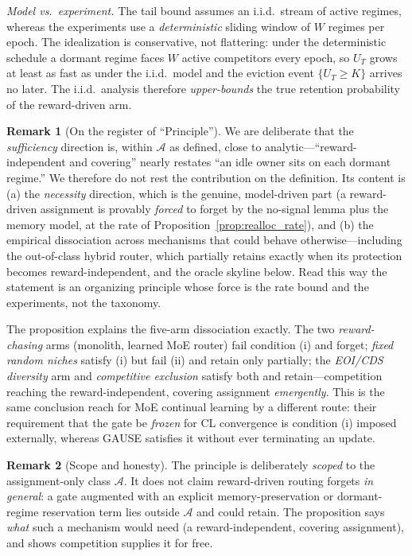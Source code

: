 \documentclass[11pt,a4paper]{article}
\theoremstyle{definition}
\newtheorem{remark}{Remark}[section]
\theoremstyle{plain}
\begin{document}
\noindent\emph{Model vs.\ experiment.} The tail bound assumes an i.i.d.\ stream of
active regimes, whereas the experiments use a \emph{deterministic} sliding window of
$W$ regimes per epoch. The idealization is conservative, not flattering: under the
deterministic schedule a dormant regime faces $W$ active competitors every epoch, so
$U_T$ grows at least as fast as under the i.i.d.\ model and the eviction event
$\{U_T\ge K\}$ arrives no later. The i.i.d.\ analysis therefore \emph{upper-bounds}
the true retention probability of the reward-driven arm.

\begin{remark}[On the register of ``Principle'']
We are deliberate that the \emph{sufficiency} direction is, within $\mathcal{A}$ as
defined, close to analytic---``reward-independent and covering'' nearly restates
``an idle owner sits on each dormant regime.'' We therefore do not rest the
contribution on the definition. Its content is (a) the \emph{necessity} direction,
which is the genuine, model-driven part (a reward-driven assignment is provably
\emph{forced} to forget by the no-signal lemma plus the memory model, at the rate of
Proposition~\ref{prop:realloc_rate}), and (b) the empirical dissociation across
mechanisms that could behave otherwise---including the out-of-class hybrid router,
which partially retains exactly when its protection becomes reward-independent, and
the oracle skyline below. Read this way the statement is an organizing principle whose
force is the rate bound and the experiments, not the taxonomy.
\end{remark}

\begin{keypoint}
The proposition explains the five-arm dissociation exactly. The two
\emph{reward-chasing} arms (monolith, learned MoE router) fail condition (i) and
forget; \emph{fixed random niches} satisfy (i) but fail (ii) and retain only
partially; the \emph{EOI/CDS diversity} arm and \emph{competitive exclusion}
satisfy both and retain---competition reaching the reward-independent, covering
assignment \emph{emergently}. This is the same conclusion \cite{li2024moecl}
reach for MoE continual learning by a different route: their requirement that the
gate be \emph{frozen} for CL convergence is condition (i) imposed externally,
whereas GAUSE satisfies it without ever terminating an update.
\end{keypoint}

\begin{remark}[Scope and honesty]
The principle is deliberately \emph{scoped} to the assignment-only class
$\mathcal{A}$. It does not claim reward-driven routing forgets \emph{in general}:
a gate augmented with an explicit memory-preservation or dormant-regime
reservation term lies outside $\mathcal{A}$ and could retain. The proposition
says \emph{what} such a mechanism would need (a reward-independent, covering
assignment), and shows competition supplies it for free.
\end{remark}
\end{document}
